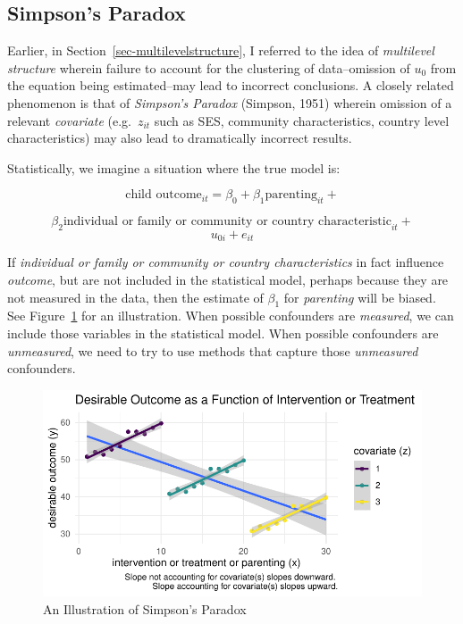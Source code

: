 \documentclass[
  letterpaper,
  DIV=11,
  numbers=noendperiod]{scrreprt}
\begin{document}
\hypertarget{simpsons-paradox}{%
\subsection{Simpson's Paradox}\label{simpsons-paradox}}

Earlier, in Section~\ref{sec-multilevelstructure}, I referred to the
idea of \emph{multilevel structure} wherein failure to account for the
clustering of data--omission of \(u_0\) from the equation being
estimated--may lead to incorrect conclusions. A closely related
phenomenon is that of \emph{Simpson's Paradox} (Simpson, 1951) wherein
omission of a relevant \emph{covariate} (e.g.~\(z_{it}\) such as SES,
community characteristics, country level characteristics) may also lead
to dramatically incorrect results.

Statistically, we imagine a situation where the true model is:

\[\text{child outcome}_{it} = \beta_0 + \beta_1 \text{parenting}_{it} +\]

\[\beta_2 \text{individual or family or community or country characteristic}_{it} + \]
\[u_{0i} + e_{it}\]

If \emph{individual or family or community or country characteristics}
in fact influence \emph{outcome}, but are not included in the
statistical model, perhaps because they are not measured in the data,
then the estimate of \(\beta_1\) for \emph{parenting} will be biased.
See Figure~\ref{fig-Simpson} for an illustration. When possible
confounders are \emph{measured}, we can include those variables in the
statistical model. When possible confounders are \emph{unmeasured}, we
need to try to use methods that capture those \emph{unmeasured}
confounders.

\begin{figure}

{\centering \includegraphics{./longitudinal_files/figure-pdf/fig-Simpson-1.pdf}

}

\caption{\label{fig-Simpson}An Illustration of Simpson's Paradox}

\end{figure}
\end{document}
